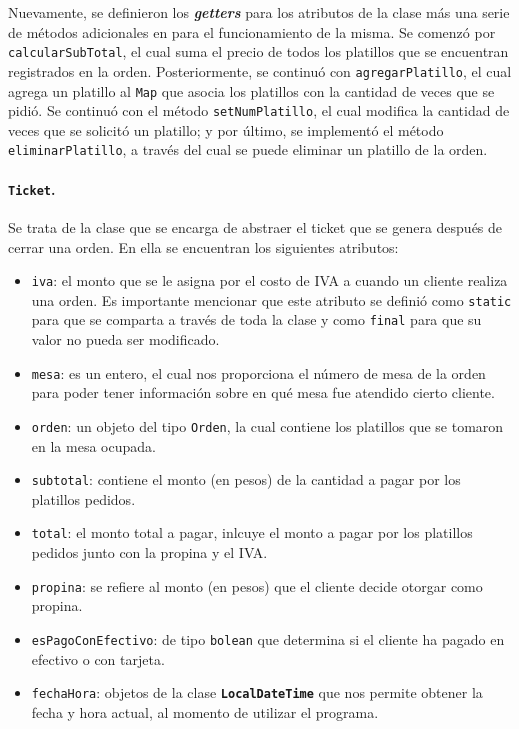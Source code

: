 Nuevamente, se definieron los \textit{\textbf{getters}} para los atributos de la clase 
más una serie de métodos adicionales en para el funcionamiento de la misma. Se comenzó por 
\texttt{calcularSubTotal}, el cual suma el precio de todos los platillos que se encuentran 
registrados en la orden. Posteriormente, se continuó con \texttt{agregarPlatillo}, el cual
agrega un platillo al \texttt{Map} que asocia los platillos con la cantidad de veces que 
se pidió. Se continuó con el método \texttt{setNumPlatillo}, el cual modifica la cantidad 
de veces que se solicitó un platillo; y por último, se implementó el método 
\texttt{eliminarPlatillo}, a través del cual se puede eliminar un platillo de la orden.

\paragraph{\texttt{Ticket}.} Se trata de la clase que se encarga de abstraer el 
ticket que se genera después de cerrar una orden. En ella se encuentran los siguientes
atributos:
\begin{itemize}
  \item \texttt{iva}: el monto que se le asigna por el costo de IVA a cuando un cliente realiza 
  una orden. Es importante mencionar que este atributo se definió como \texttt{static} para que
  se comparta a través de toda la clase y como \texttt{final} para que su valor no pueda ser 
  modificado.
  \item \texttt{mesa}: es un entero, el cual nos proporciona el número de mesa de la orden para poder 
  tener información sobre en qué mesa fue atendido cierto cliente. 
  \item \texttt{orden}: un objeto del tipo \texttt{Orden}, la cual contiene los platillos 
  que se tomaron en la mesa ocupada. 
  \item \texttt{subtotal}: contiene el monto (en pesos) de la cantidad a pagar por los platillos 
  pedidos. 
  \item \texttt{total}: el monto total a pagar, inlcuye el monto a pagar por los platillos pedidos junto con la 
  propina y el IVA. 
  \item \texttt{propina}: se refiere al monto (en pesos) que el cliente decide otorgar como propina.
  \item \texttt{esPagoConEfectivo}: de tipo \texttt{bolean} que determina si el cliente ha pagado en 
  efectivo o con tarjeta. 
  \item \texttt{fechaHora}: objetos de la clase \texttt{\textbf{LocalDateTime}} que nos permite 
  obtener la fecha y hora actual, al momento de utilizar el programa. 
\end{itemize}

